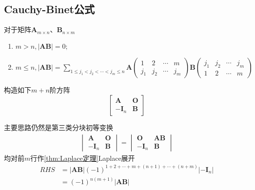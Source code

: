 \subsection{Cauchy-Binet公式}
\setcounter{equation}{0}%
\begin{formal}
\begin{theorem}\label{thm:Cauchy-Binet公式}
    对于矩阵$\bm{A}_{m \times n}$、$
    \bm{B}_{n \times m}$
    \begin{enumerate}[label=\textup{(\arabic*)}]
        \item $m > n,\left|\bm{AB}\right| = 0;$
        \item $\displaystyle
        m \leqslant n,\left|\bm{AB}\right|
        = \sum_{1\leqslant j_1 < j_2<\cdots
        < j_m \leqslant n}
        \bm{A}\begin{pmatrix}
            1 & 2&\cdots & m \\
            j_1 & j_2&\cdots & j_m
        \end{pmatrix}
        \bm{B}\begin{pmatrix}
            j_1 & j_2&\cdots & j_m \\
            1 & 2&\cdots & m 
        \end{pmatrix}$
    \end{enumerate}
\end{theorem}
\begin{Proof}
构造如下$m+n$阶方阵
\[
\begin{bmatrix}
    \bm{A}&\bm{O}\\
    -\bm{I}_n&\bm{B}
\end{bmatrix}
\]

主要思路仍然是第三类分块初等变换
\begin{align*}
    \begin{vmatrix}
    \bm{A}&\bm{O}\\
    -\bm{I}_n&\bm{B}
\end{vmatrix}=\begin{vmatrix}
    \bm{O}&\bm{AB}\\
    -\bm{I}_n&\bm{B}
\end{vmatrix}
\end{align*}
均对前$m$行作\cref{thm:Laplace定理}Laplace展开
\begin{align*}
    RHS&=\left|\bm{AB}\right|\left(-1\right)^{
        1+2+\cdots+m+\left(n+1\right)+\cdots+\left(n+m\right)
    }\left|-\bm{I}_n\right|\\
    &=\left(-1\right)^{n\left(m+1\right)}\left|\bm{AB}\right|
\end{align*}


\end{Proof}
\end{formal}
